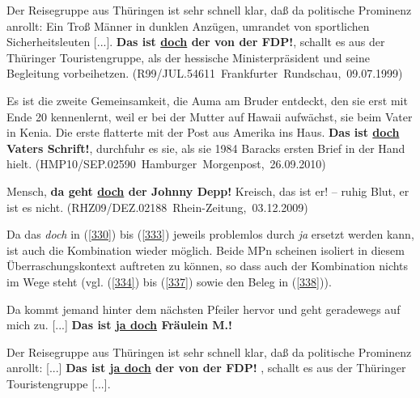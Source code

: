 \begin{exe}
	\ex\label{331}
	\scriptsize 
	Der Reisegruppe aus Thüringen ist sehr schnell klar, daß da politische Prominenz anrollt: Ein Troß Männer in dunklen Anzügen, umrandet von sportlichen 	Sicherheitsleuten [...].  \glqq \textbf{Das ist \underline{doch} der von der FDP!}\grqq{}, schallt es aus der Thüringer Touristengruppe, als der 			hessische Ministerpräsident und seine Begleitung vorbeihetzen.	     
	\hfill\hbox{(R99/JUL.54611 Frankfurter Rundschau, 09.07.1999)}	
\end{exe}				
							
\begin{exe}
	\ex\label{332}
	\scriptsize 
	Es ist die zweite Gemeinsamkeit, die Auma am Bruder entdeckt, den sie erst mit Ende 20 kennenlernt, weil er bei der Mutter auf Hawaii aufwächst, sie beim Vater in Kenia. Die erste flatterte mit der Post aus Amerika ins Haus. \glqq \textbf{Das ist \underline{doch} Vaters Schrift!}\grqq{}, durchfuhr es sie, als sie 1984 Baracks ersten Brief in der Hand hielt.        
	\hfill\hbox{(HMP10/SEP.02590 Hamburger Morgenpost, 26.09.2010)}	
\end{exe}
		
\begin{exe}
	\ex\label{333}
	\scriptsize 
	Mensch, \textbf{da geht \underline{doch} der Johnny Depp!} Kreisch, das ist er! – ruhig Blut, er ist es nicht.    
	\newline
	\hbox{}\hfill\hbox{(RHZ09/DEZ.02188 Rhein-Zeitung, 03.12.2009)}	
\end{exe}	                                                                
Da das \textit{doch} in (\ref{330}) bis (\ref{333}) jeweils problemlos durch \textit{ja} ersetzt werden kann, ist auch die Kombination wieder möglich. Beide MPn scheinen isoliert in diesem \glq Überraschungs\grq {}kontext auftreten zu können, so dass auch der Kombination nichts im Wege steht (vgl. (\ref{334}) bis (\ref{337}) sowie den Beleg in (\ref{338})).

\begin{exe}
	\ex\label{334}
	\scriptsize 
	Da kommt jemand hinter dem nächsten Pfeiler hervor und geht geradewegs auf mich zu. [...] \textbf{Das ist \underline{ja doch} Fräulein M.!}	
\end{exe}	

\begin{exe}
	\ex\label{335}
	\scriptsize 
	Der Reisegruppe aus Thüringen ist sehr schnell klar, daß da politische Prominenz anrollt: [...]  \glqq \textbf{Das ist \underline{ja doch} der von der FDP!}			\grqq{}, schallt es aus der Thüringer Touristengruppe [...].
\end{exe}

